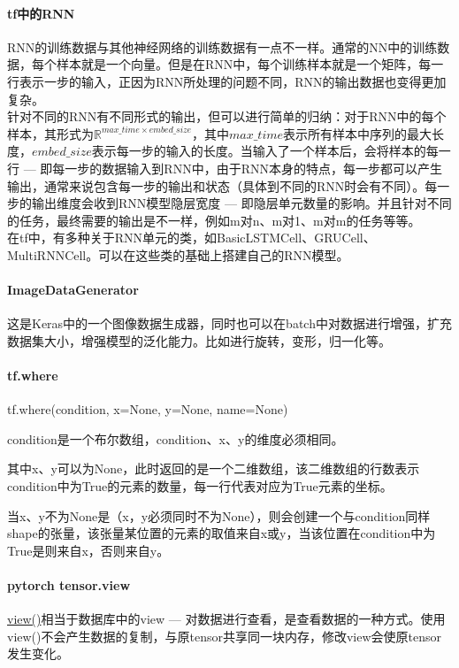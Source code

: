 \paragraph{tf中的RNN}RNN的训练数据与其他神经网络的训练数据有一点不一样。通常的NN中的训练数据，每个样本就是一个向量。但是在RNN中，每个训练样本就是一个矩阵，每一行表示一步的输入，正因为RNN所处理的问题不同，RNN的输出数据也变得更加复杂。\\
针对不同的RNN有不同形式的输出，但可以进行简单的归纳：对于RNN中的每个样本，其形式为$\mathbb{R}^{max\_time \times embed\_size}$，其中$max\_time$表示所有样本中序列的最大长度，$embed\_size$表示每一步的输入的长度。当输入了一个样本后，会将样本的每一行 --- 即每一步的数据输入到RNN中，由于RNN本身的特点，每一步都可以产生输出，通常来说包含每一步的输出和状态（具体到不同的RNN时会有不同）。每一步的输出维度会收到RNN模型隐层宽度 --- 即隐层单元数量的影响。并且针对不同的任务，最终需要的输出是不一样，例如m对n、m对1、m对m的任务等等。\\
在tf中，有多种关于RNN单元的类，如BasicLSTMCell、GRUCell、MultiRNNCell。可以在这些类的基础上搭建自己的RNN模型。


\paragraph{ImageDataGenerator}
这是Keras中的一个图像数据生成器，同时也可以在batch中对数据进行增强，扩充数据集大小，增强模型的泛化能力。比如进行旋转，变形，归一化等。

\paragraph{tf.where}
tf.where(condition, x=None, y=None, name=None)

condition是一个布尔数组，condition、x、y的维度必须相同。

其中x、y可以为None，此时返回的是一个二维数组，该二维数组的行数表示condition中为True的元素的数量，每一行代表对应为True元素的坐标。

当x、y不为None是（x，y必须同时不为None），则会创建一个与condition同样shape的张量，该张量某位置的元素的取值来自x或y，当该位置在condition中为True是则来自x，否则来自y。

\paragraph{pytorch tensor.view}
\href{https://pytorch.org/docs/stable/tensor_view.html}{view()}相当于数据库中的view --- 对数据进行查看，是查看数据的一种方式。使用view()不会产生数据的复制，与原tensor共享同一块内存，修改view会使原tensor发生变化。

